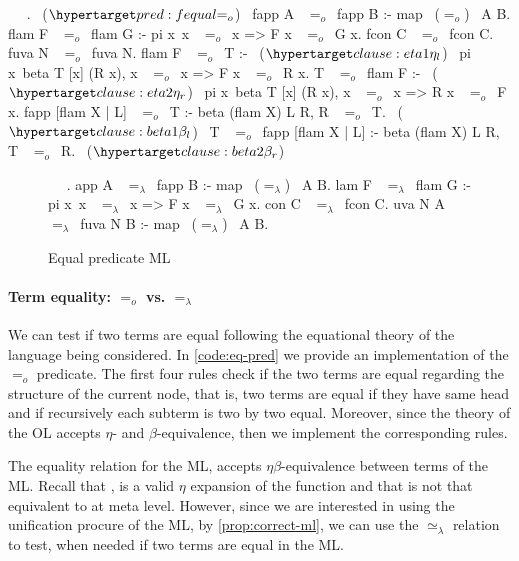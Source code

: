 \documentclass[sigconf,natbib=false,review]{acmart}
\newcommand{\EqualRel}{\ensuremath{=}}
\newcommand{\UnifRel}{\ensuremath{\simeq}}
\newcommand{\Eo}{\ensuremath{\EqualRel_o}\xspace}
\newcommand{\Ue}{\ensuremath{\UnifRel_\lambda}\xspace}
\newcommand{\Ee}{\ensuremath{\EqualRel_\lambda}\xspace}
\begin{document}
\begin{elpicode}
  ~ \PYG{n+nf}{(\Eo)} ~.                           ~($\customlabel{pred:fequal}{\Eo}$)~
  fapp A ~\Eo~fapp B :- map ~(\Eo)~ A B.
  flam F ~\Eo~flam G :- pi x\ x ~\Eo~x => F x ~\Eo~G x.
  fcon C ~\Eo~fcon C.
  fuva N ~\Eo~fuva N.
  flam F ~\Eo~T :-                                       ~($\customlabel{clause:eta1}{\eta_l}$)~
    pi x\ beta T [x] (R x), x ~\Eo~x => F x ~\Eo~R x.
  T ~\Eo~flam F :-                                       ~($\customlabel{clause:eta2}{\eta_r}$)~
    pi x\ beta T [x] (R x), x ~\Eo~x => R x ~\Eo~F x.
  fapp [flam X | L] ~\Eo~T :- beta (flam X) L R, R ~\Eo~T. ~($\customlabel{clause:beta1}{\beta_l}$)~
  T ~\Eo~fapp [flam X | L] :- beta (flam X) L R, T ~\Eo~R. ~($\customlabel{clause:beta2}{\beta_r}$)~
\end{elpicode}

\begin{figure}
  \begin{elpicode}
    ~ \PYG{n+nf}{(\Ee)} ~.
    app A ~\Ee~fapp B :- map ~(\Ee)~ A B.
    lam F ~\Ee~flam G :- pi x\ x ~\Ee~x => F x ~\Ee~G x.
    con C ~\Ee~fcon C.
    uva N A ~\Ee~fuva N B :- map ~(\Ee)~ A B.
  \end{elpicode}
  \caption{Equal predicate ML}
  \label{code:eq-pred-meta}
\end{figure}

\paragraph{Term equality: \Eo vs. \Ee} We can test if two terms are equal
following the equational theory of the language being considered. In
\cref{code:eq-pred} we provide an implementation of the \Eo predicate. The first
four rules check if the two terms are equal regarding the structure of the
current node, that is, two terms are equal if they have same head and if
recursively each subterm is two by two equal. Moreover, since the theory of the
OL accepts $\eta$- and $\beta$-equivalence, then we implement the corresponding
rules.

\noindent
The equality relation for the ML, accepts $\eta\beta$-equivalence between terms
of the ML. Recall that , is a valid $\eta$ expansion of the
function  and that  is not that equivalent to
 at meta level. However, since we are interested in using the
unification procure of the ML, by \cref{prop:correct-ml}, we can use the
\Ue relation to test, when needed if two terms are equal in the ML.
\end{document}
